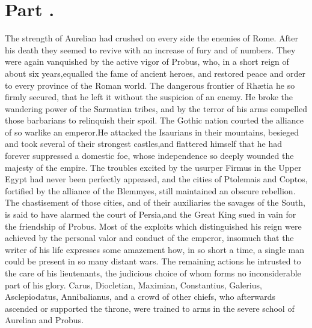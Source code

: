 \section{Part \thesection.}
\thispagestyle{simple}

The strength of Aurelian had crushed on every side the enemies of
Rome. After his death they seemed to revive with an increase of
fury and of numbers. They were again vanquished by the active
vigor of Probus, who, in a short reign of about six years,\footnotemark[29]
equalled the fame of ancient heroes, and restored peace and order
to every province of the Roman world. The dangerous frontier of
Rhætia he so firmly secured, that he left it without the
suspicion of an enemy. He broke the wandering power of the
Sarmatian tribes, and by the terror of his arms compelled those
barbarians to relinquish their spoil. The Gothic nation courted
the alliance of so warlike an emperor.\footnotemark[30] He attacked the
Isaurians in their mountains, besieged and took several of their
strongest castles,\footnotemark[31] and flattered himself that he had forever
suppressed a domestic foe, whose independence so deeply wounded
the majesty of the empire. The troubles excited by the usurper
Firmus in the Upper Egypt had never been perfectly appeased, and
the cities of Ptolemais and Coptos, fortified by the alliance of
the Blemmyes, still maintained an obscure rebellion. The
chastisement of those cities, and of their auxiliaries the
savages of the South, is said to have alarmed the court of
Persia,\footnotemark[32] and the Great King sued in vain for the friendship of
Probus. Most of the exploits which distinguished his reign were
achieved by the personal valor and conduct of the emperor,
insomuch that the writer of his life expresses some amazement
how, in so short a time, a single man could be present in so many
distant wars. The remaining actions he intrusted to the care of
his lieutenants, the judicious choice of whom forms no
inconsiderable part of his glory. Carus, Diocletian, Maximian,
Constantius, Galerius, Asclepiodatus, Annibalianus, and a crowd
of other chiefs, who afterwards ascended or supported the throne,
were trained to arms in the severe school of Aurelian and Probus.\footnotemark[33]


